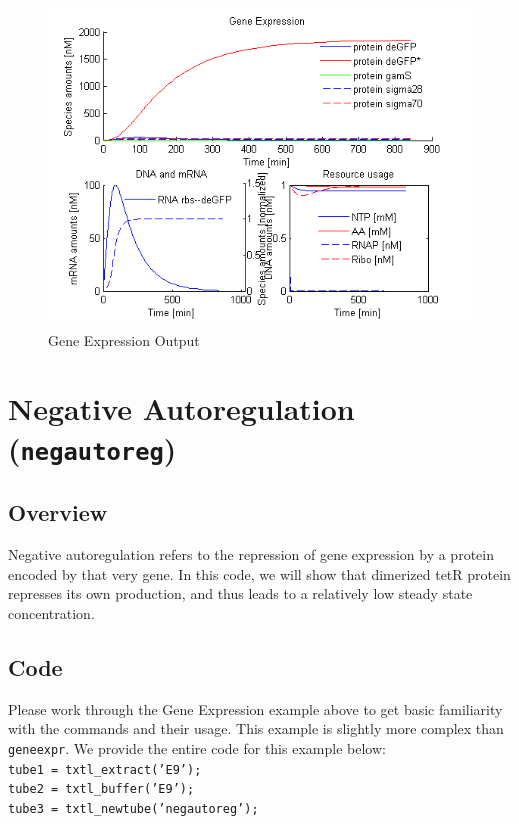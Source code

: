 \documentclass[english]{report}
\begin{document}
		
		\begin{figure}
		\begin{center}
		\includegraphics[width=\textwidth]{GeneExpressionPlotActuallyProducedByCode.png} 
		\caption{Gene Expression Output}
		\label{fig:geneexpr}
		\end{center}
		
		\end{figure}
		
	\section{Negative Autoregulation (\texttt{negautoreg})}
		\subsection{Overview}
		Negative autoregulation refers to the repression of gene expression by a protein encoded by that very gene. In this code, we will show that dimerized tetR protein represses its own production, and thus leads to a relatively low steady state concentration. 
		\subsection{Code}
		Please work through the Gene Expression example above to get basic familiarity with the commands and their usage. This example is slightly more complex than \texttt{geneexpr}. We provide the entire code for this example below: \\
		
		\noindent \texttt{tube1 = txtl\_extract('E9');} \\
								\texttt{tube2 = txtl\_buffer('E9');} \\
								\texttt{tube3 = txtl\_newtube('negautoreg');} 
								\vspace*{1\baselineskip}
								
\end{document}
